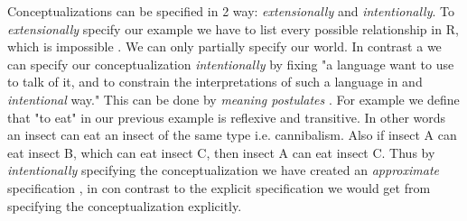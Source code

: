 \documentclass[12pt,a4paper]{article}
\begin{document}
Conceptualizations can be specified in 2 way: \emph{extensionally} and \emph{intentionally}\citep[p.8]{GuObSt09}. To \emph{extensionally} specify our example we have to list every possible relationship in R, which is impossible \cite{GuObSt09}. We can only partially specify our world. 
In contrast a we can specify our conceptualization \emph{intentionally} by fixing "a language want to use to talk of it, and to constrain the interpretations of such a language in and \emph{intentional} way." \citep[p.8]{GuObSt09} This can be done by \emph{meaning postulates} \cite{Nagel1948}. For example we define that "to eat" in our previous example is reflexive and transitive. In other words an insect can eat an insect of the same type i.e. cannibalism. Also if insect A can eat insect B, which can eat insect C, then insect A can eat insect C.
Thus by \emph{intentionally} specifying the conceptualization we have created an \emph{approximate} specification \cite{GuObSt09}, in con contrast to the explicit specification we would get from specifying the conceptualization explicitly. 



\end{document}
